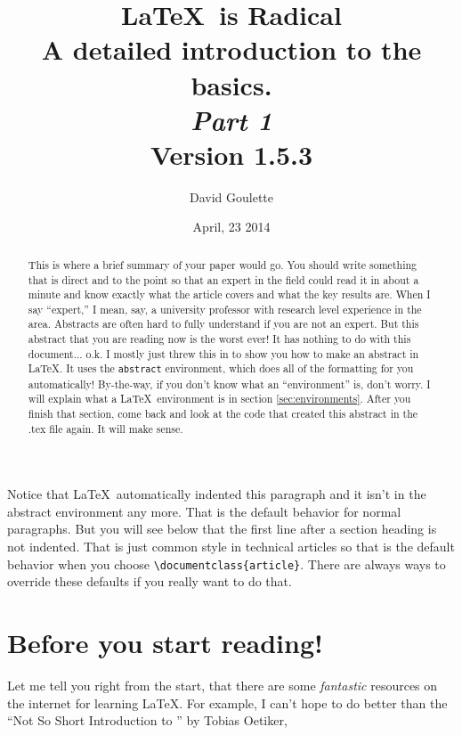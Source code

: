 \documentclass{article}
\author{David Goulette}
\date{April, 23 2014}
\title{\LaTeX\ is Radical\vspace{1mm}\\  {\large A detailed introduction to the basics.\vspace{4pt}\\\textsl{Part 1}\vspace{2mm}\\\normalsize Version 1.5.3}}
\begin{document}

\maketitle %


\begin{abstract}
This is where a brief summary of your paper would go.  You should write something that is direct and to the point so that an expert in the field could read it in about a minute and know exactly what the article covers and what the key results are.  When I say ``expert,'' I mean, say, a university professor with research level experience in the area.  Abstracts are often hard to fully understand if you are not an expert.  But this abstract that you are reading now is the worst ever! It has nothing to do with this document... o.k.  I mostly just threw this in to show you how to make an abstract in \LaTeX.  It uses the \texttt{abstract} environment, which does all of the formatting for you automatically!  By-the-way, if you don't know what an ``environment'' is, don't worry. I will explain what a \LaTeX\ environment is in section \ref{sec:environments}.  After you finish that section, come back and look at the code that created this abstract in the .tex file again.  It will make sense.
\end{abstract}
\tableofcontents %
\newpage %

Notice that \LaTeX\ automatically indented this paragraph and it isn't in the abstract environment any more. That is the default behavior for normal paragraphs. But you will see below that the first line after a section heading is not indented.  That is just common style in technical articles so that is the default behavior when you choose \verb|\documentclass{article}|.  There are always ways to override these defaults if you really want to do that.

\section{Before you start reading!}
Let me tell you right from the start, that there are some \emph{fantastic} resources on the internet for learning \LaTeX.  For example, I can't hope to do better than the ``Not So Short Introduction to \LaTeXe'' by Tobias Oetiker,\\
\end{document}
